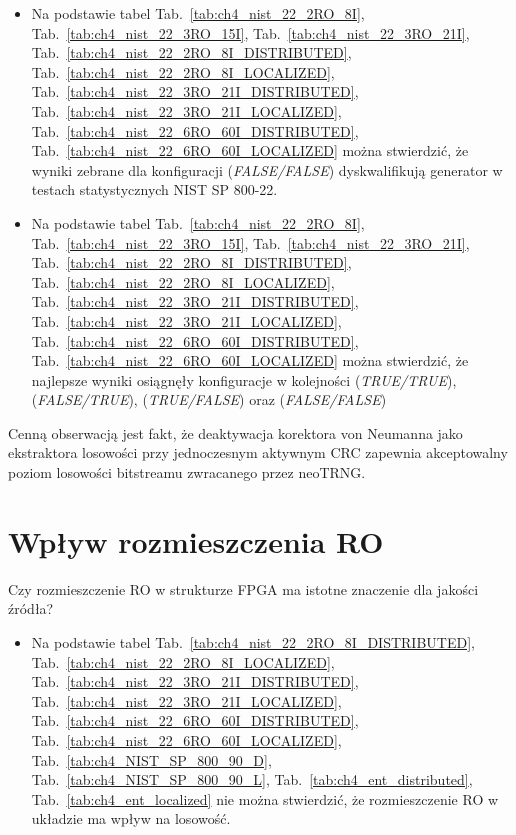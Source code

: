 \begin{itemize}
\item Na podstawie tabel Tab.~\ref{tab:ch4_nist_22_2RO_8I},
Tab.~\ref{tab:ch4_nist_22_3RO_15I}, Tab.~\ref{tab:ch4_nist_22_3RO_21I},
Tab.~\ref{tab:ch4_nist_22_2RO_8I_DISTRIBUTED}, Tab.~\ref{tab:ch4_nist_22_2RO_8I_LOCALIZED},
Tab.~\ref{tab:ch4_nist_22_3RO_21I_DISTRIBUTED}, Tab.~\ref{tab:ch4_nist_22_3RO_21I_LOCALIZED},
Tab.~\ref{tab:ch4_nist_22_6RO_60I_DISTRIBUTED}, Tab.~\ref{tab:ch4_nist_22_6RO_60I_LOCALIZED}
można stwierdzić, że wyniki zebrane dla konfiguracji (\textit{FALSE/FALSE}) dyskwalifikują
generator w testach statystycznych NIST SP 800-22.
\item Na podstawie tabel  Tab.~\ref{tab:ch4_nist_22_2RO_8I},
Tab.~\ref{tab:ch4_nist_22_3RO_15I}, Tab.~\ref{tab:ch4_nist_22_3RO_21I},
Tab.~\ref{tab:ch4_nist_22_2RO_8I_DISTRIBUTED}, Tab.~\ref{tab:ch4_nist_22_2RO_8I_LOCALIZED},
Tab.~\ref{tab:ch4_nist_22_3RO_21I_DISTRIBUTED}, Tab.~\ref{tab:ch4_nist_22_3RO_21I_LOCALIZED},
Tab.~\ref{tab:ch4_nist_22_6RO_60I_DISTRIBUTED}, Tab.~\ref{tab:ch4_nist_22_6RO_60I_LOCALIZED}
można stwierdzić, że najlepsze wyniki osiągnęły konfiguracje w kolejności
(\textit{TRUE/TRUE}), (\textit{FALSE/TRUE}), (\textit{TRUE/FALSE}) oraz (\textit{FALSE/FALSE})
\end{itemize}

Cenną obserwacją jest fakt, że deaktywacja korektora von Neumanna jako 
ekstraktora losowości przy jednoczesnym aktywnym CRC zapewnia akceptowalny 
poziom losowości bitstreamu zwracanego przez neoTRNG.

\section{Wpływ rozmieszczenia RO}
\noindent Czy rozmieszczenie RO w strukturze FPGA ma istotne znaczenie dla jakości źródła?
\begin{itemize}
\item Na podstawie tabel
Tab.~\ref{tab:ch4_nist_22_2RO_8I_DISTRIBUTED}, Tab.~\ref{tab:ch4_nist_22_2RO_8I_LOCALIZED},
Tab.~\ref{tab:ch4_nist_22_3RO_21I_DISTRIBUTED}, Tab.~\ref{tab:ch4_nist_22_3RO_21I_LOCALIZED},
Tab.~\ref{tab:ch4_nist_22_6RO_60I_DISTRIBUTED}, Tab.~\ref{tab:ch4_nist_22_6RO_60I_LOCALIZED},
Tab.~\ref{tab:ch4_NIST_SP_800_90_D}, Tab.~\ref{tab:ch4_NIST_SP_800_90_L},
Tab.~\ref{tab:ch4_ent_distributed}, Tab.~\ref{tab:ch4_ent_localized}
nie można stwierdzić, że rozmieszczenie RO w układzie ma wpływ na losowość.
\end{itemize}

